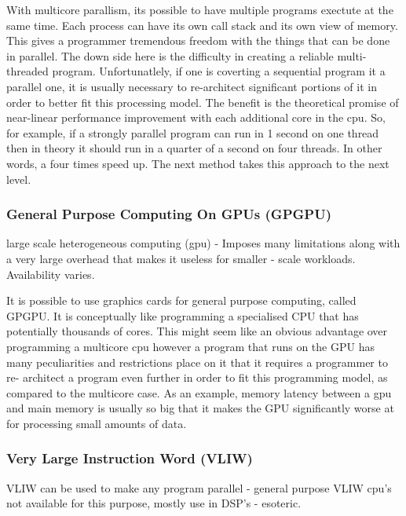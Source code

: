 \begin{roughwork}

	With multicore parallism, its possible to have multiple programs exectute at the
	same time. Each process can have its own call stack and its own view of memory.
	This gives a programmer tremendous freedom with the things that can be done in
	parallel. The down side here is the difficulty in creating a reliable multi-
	threaded program. Unfortunatlely, if one is coverting a sequential program it
	a parallel one, it is usually necessary to re-architect significant portions of
	it in order to better fit this processing model. The benefit is the theoretical
	promise of near-linear performance improvement with each additional core in the
	cpu. So, for example, if a strongly parallel program can run in 1 second on one
	thread then in theory it should run in a quarter of a second on four threads. In
	other words, a four times speed up. The next method takes this approach to the
	next level.

\end{roughwork}


\subsubsection{General Purpose Computing On GPUs (GPGPU)}
\begin{sectionplan}
     large scale heterogeneous computing (gpu) - Imposes many limitations along
with a very large overhead that makes it useless for smaller - scale workloads.
Availability varies.
\end{sectionplan}

\begin{roughwork}

	It is possible to use graphics cards for general purpose computing, called
	GPGPU. It is conceptually like programming a specialised CPU that has
	potentially thousands of cores. This might seem like an obvious advantage over
	programming a multicore cpu however a program that runs on the GPU has many
	peculiarities and restrictions place on it that it requires a programmer to re-
	architect a program even further in order to fit this programming model, as
	compared to the multicore case. As an example, memory latency between a gpu and
	main memory is usually so big that it makes the GPU significantly worse at for
	processing small amounts of data.

\end{roughwork}

\subsubsection{Very Large Instruction Word (VLIW)}
\begin{sectionplan}
     VLIW can be used to make any program parallel - general purpose VLIW cpu's
not available for this purpose, mostly use in DSP's - esoteric.
\end{sectionplan}
\cite{fisher_parallel_2004}

